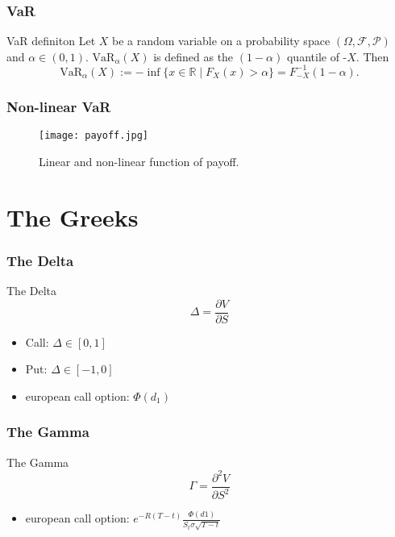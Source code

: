 \documentclass{beamer}
\newcommand{\R}{\mathbb R}
\newcommand{\f}{\mathcal F}
\begin{document}
\begin{frame}
    \frametitle{VaR}
    \begin{block}{VaR definiton}
        Let $X$ be a random variable on a probability space $(\Omega, \f, \mathcal{P})$ and $\alpha \in (0, 1)$.
        $\text{VaR}_\alpha(X)$ is defined as the $(1-\alpha)$ quantile of -$X$. Then
        $$
        \text{VaR}_\alpha(X) := - \inf \{ x \in \R \mid F_X(x) > \alpha \} = F^{-1}_{-X}(1-\alpha).
        $$
    \end{block}
\end{frame}

\begin{frame}
    \frametitle{Non-linear VaR}
    \begin{figure}\label{payoff}
        \texttt{[image: payoff.jpg]}
        \caption{Linear and non-linear function of payoff.}
    \end{figure}
\end{frame}

\section{The Greeks}

\begin{frame}
    \frametitle{The Delta}
    \begin{block}{The Delta}
        $$
        \Delta = \frac{\partial V}{\partial S}
        $$ 
    \end{block}
    \begin{itemize}
        \item<2-> Call: $\Delta\in [0,1]$
        \item<3-> Put: $\Delta\in [-1,0]$
        \item<4-> european call option: $\Phi(d_1)$
    \end{itemize}
\end{frame}

\begin{frame}
    \frametitle{The Gamma}
    \begin{block}{The Gamma}
        $$
        \Gamma = \frac{\partial^2 V}{\partial S^2}
        $$
    \end{block}
    \begin{itemize}
        \item<2-> european call option: $e^{-R(T-t)}\frac{\Phi(d1)}{S_t\sigma\sqrt{T-t}}$
    \end{itemize}
\end{frame}
\end{document}
